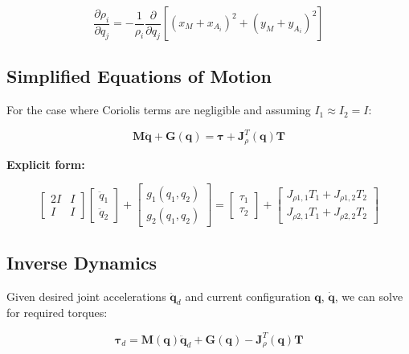 \begin{equation}
\frac{\partial \rho_i}{\partial q_j} = -\frac{1}{\rho_i} \frac{\partial}{\partial q_j} \left[(x_M + x_{A_i})^2 + (y_M + y_{A_i})^2\right]
\end{equation}

\subsection{Simplified Equations of Motion}

For the case where Coriolis terms are negligible and assuming $I_1 \approx I_2 = I$:

\begin{equation}
\mathbf{M} \ddot{\mathbf{q}} + \mathbf{G}(\mathbf{q}) = \boldsymbol{\tau} + \mathbf{J}_{\rho}^T(\mathbf{q}) \mathbf{T}
\end{equation}

\textbf{Explicit form:}

\begin{equation}
\begin{bmatrix}
2I & I \\
I & I
\end{bmatrix} \begin{bmatrix}
\ddot{q}_1 \\
\ddot{q}_2
\end{bmatrix} + \begin{bmatrix}
g_1(q_1, q_2) \\
g_2(q_1, q_2)
\end{bmatrix} = \begin{bmatrix}
\tau_1 \\
\tau_2
\end{bmatrix} + \begin{bmatrix}
J_{\rho 1,1} T_1 + J_{\rho 1,2} T_2 \\
J_{\rho 2,1} T_1 + J_{\rho 2,2} T_2
\end{bmatrix}
\end{equation}

\subsection{Inverse Dynamics}

Given desired joint accelerations $\ddot{\mathbf{q}}_d$ and current configuration $\mathbf{q}$, $\dot{\mathbf{q}}$, we can solve for required torques:

\begin{equation}
\boldsymbol{\tau}_d = \mathbf{M}(\mathbf{q}) \ddot{\mathbf{q}}_d + \mathbf{G}(\mathbf{q}) - \mathbf{J}_{\rho}^T(\mathbf{q}) \mathbf{T}
\end{equation}

